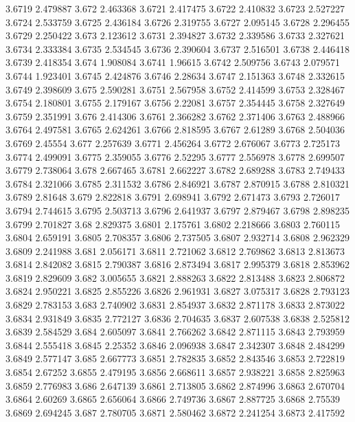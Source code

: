 3.6719  2.479887
3.672  2.463368
3.6721  2.417475
3.6722  2.410832
3.6723  2.527227
3.6724  2.533759
3.6725  2.436184
3.6726  2.319755
3.6727  2.095145
3.6728  2.296455
3.6729  2.250422
3.673  2.123612
3.6731  2.394827
3.6732  2.339586
3.6733  2.327621
3.6734  2.333384
3.6735  2.534545
3.6736  2.390604
3.6737  2.516501
3.6738  2.446418
3.6739  2.418354
3.674  1.908084
3.6741  1.96615
3.6742  2.509756
3.6743  2.079571
3.6744  1.923401
3.6745  2.424876
3.6746  2.28634
3.6747  2.151363
3.6748  2.332615
3.6749  2.398609
3.675  2.590281
3.6751  2.567958
3.6752  2.414599
3.6753  2.328467
3.6754  2.180801
3.6755  2.179167
3.6756  2.22081
3.6757  2.354445
3.6758  2.327649
3.6759  2.351991
3.676  2.414306
3.6761  2.366282
3.6762  2.371406
3.6763  2.488966
3.6764  2.497581
3.6765  2.624261
3.6766  2.818595
3.6767  2.61289
3.6768  2.504036
3.6769  2.45554
3.677  2.257639
3.6771  2.456264
3.6772  2.676067
3.6773  2.725173
3.6774  2.499091
3.6775  2.359055
3.6776  2.52295
3.6777  2.556978
3.6778  2.699507
3.6779  2.738064
3.678  2.667465
3.6781  2.662227
3.6782  2.689288
3.6783  2.749433
3.6784  2.321066
3.6785  2.311532
3.6786  2.846921
3.6787  2.870915
3.6788  2.810321
3.6789  2.81648
3.679  2.822818
3.6791  2.698941
3.6792  2.671473
3.6793  2.726017
3.6794  2.744615
3.6795  2.503713
3.6796  2.641937
3.6797  2.879467
3.6798  2.898235
3.6799  2.701827
3.68  2.829375
3.6801  2.175761
3.6802  2.218666
3.6803  2.760115
3.6804  2.659191
3.6805  2.708357
3.6806  2.737505
3.6807  2.932714
3.6808  2.962329
3.6809  2.241988
3.681  2.056171
3.6811  2.721062
3.6812  2.769862
3.6813  2.813673
3.6814  2.842082
3.6815  2.790387
3.6816  2.873494
3.6817  2.995379
3.6818  2.853962
3.6819  2.829609
3.682  3.005655
3.6821  2.888263
3.6822  2.813488
3.6823  2.806872
3.6824  2.950221
3.6825  2.855226
3.6826  2.961931
3.6827  3.075317
3.6828  2.793123
3.6829  2.783153
3.683  2.740902
3.6831  2.854937
3.6832  2.871178
3.6833  2.873022
3.6834  2.931849
3.6835  2.772127
3.6836  2.704635
3.6837  2.607538
3.6838  2.525812
3.6839  2.584529
3.684  2.605097
3.6841  2.766262
3.6842  2.871115
3.6843  2.793959
3.6844  2.555418
3.6845  2.25352
3.6846  2.096938
3.6847  2.342307
3.6848  2.484299
3.6849  2.577147
3.685  2.667773
3.6851  2.782835
3.6852  2.843546
3.6853  2.722819
3.6854  2.67252
3.6855  2.479195
3.6856  2.668611
3.6857  2.938221
3.6858  2.825963
3.6859  2.776983
3.686  2.647139
3.6861  2.713805
3.6862  2.874996
3.6863  2.670704
3.6864  2.60269
3.6865  2.656064
3.6866  2.749736
3.6867  2.887725
3.6868  2.75539
3.6869  2.694245
3.687  2.780705
3.6871  2.580462
3.6872  2.241254
3.6873  2.417592
